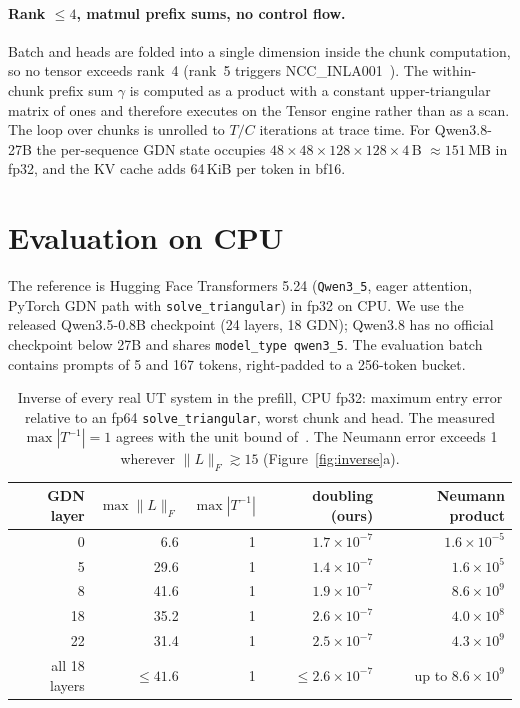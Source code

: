\documentclass[11pt]{article}
\theoremstyle{remark}
\begin{document}
\paragraph{Rank $\le4$, matmul prefix sums, no control flow.} Batch and heads are folded into a single dimension inside the
chunk computation, so no tensor exceeds rank~4 (rank~5 triggers NCC\_INLA001~\cite{nxdicontrib}). The within-chunk prefix sum
$\gamma$ is computed as a product with a constant upper-triangular matrix of ones and therefore executes on the Tensor engine
rather than as a scan. The loop over chunks is unrolled to $T/C$ iterations at trace time. For Qwen3.8-27B the per-sequence
GDN state occupies $48\times48\times128\times128\times4$\,B $\approx 151$\,MB in fp32, and the KV cache adds 64\,KiB per token
in bf16.

\section{Evaluation on CPU}\label{sec:eval}
The reference is Hugging Face Transformers 5.24 (\texttt{Qwen3\_5}, eager attention, PyTorch GDN path with
\texttt{solve\_triangular}) in fp32 on CPU. We use the released Qwen3.5-0.8B checkpoint (24 layers, 18 GDN); Qwen3.8 has no
official checkpoint below 27B and shares \texttt{model\_type}~\texttt{qwen3\_5}. The evaluation batch contains prompts of 5
and 167 tokens, right-padded to a 256-token bucket.

\begin{table}[t]
\centering\small
\begin{tabular}{rrrrr}
\toprule
GDN layer & $\max\lVert L\rVert_F$ & $\max|T^{-1}|$ & doubling (ours) & Neumann product \\
\midrule
0  & 6.6  & 1 & $1.7\times10^{-7}$ & $1.6\times10^{-5}$ \\
5  & 29.6 & 1 & $1.4\times10^{-7}$ & $1.6\times10^{5}$ \\
8  & 41.6 & 1 & $1.9\times10^{-7}$ & $8.6\times10^{9}$ \\
18 & 35.2 & 1 & $2.6\times10^{-7}$ & $4.0\times10^{8}$ \\
22 & 31.4 & 1 & $2.5\times10^{-7}$ & $4.3\times10^{9}$ \\
\midrule
all 18 layers & $\le 41.6$ & 1 & $\le 2.6\times10^{-7}$ & up to $8.6\times10^{9}$ \\
\bottomrule
\end{tabular}
\caption{Inverse of every real UT system in the prefill, CPU fp32: maximum entry error relative to an fp64
\texttt{solve\_triangular}, worst chunk and head. The measured $\max|T^{-1}|=1$ agrees with the unit bound
of~\cite{sobczyk2026tri}. The Neumann error exceeds 1 wherever $\lVert L\rVert_F\gtrsim15$ (Figure~\ref{fig:inverse}a).}
\label{tab:inverse}
\end{table}
\end{document}
